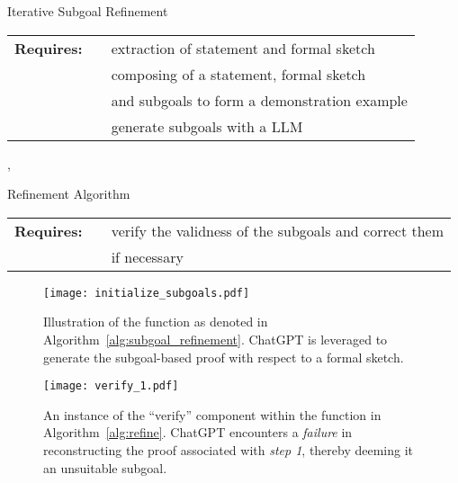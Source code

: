 \documentclass{article}
\begin{document}
\begin{algorithm}[]
\caption{Iterative Subgoal Refinement}
    \label{alg:subgoal_refinement}
\begin{tabular}{ l c l }
    \textbf{Requires: }
    &  & extraction of statement and formal sketch  \\
    &  & composing of a statement, formal sketch \\ 
    & & and subgoals to form a demonstration example \\
    &  & generate subgoals with a LLM \\ 
\end{tabular}
\begin{algorithmic}
                \State , 
                \State 
                \State 
                \State 
            \EndFor
        \EndFor
        \State \Return 
    \EndFunction
\end{algorithmic}
\end{algorithm}

\begin{algorithm}[]
\caption{Refinement Algorithm}
    \label{alg:refine}
\begin{tabular}{ l c l }
    \textbf{Requires: }
    &  & verify the validness of the subgoals and correct them \\
    & & if necessary \\
\end{tabular}
\begin{algorithmic}
            \Return 
        \EndIf
        \State 
        \State 
        \State \Return 
    \EndFunction
\end{algorithmic}
\end{algorithm}

\clearpage
\begin{figure*}
    \centering
    \texttt{[image: initialize\_subgoals.pdf]}
    \caption{Illustration of the  function as denoted in Algorithm~\ref{alg:subgoal_refinement}. ChatGPT is leveraged to generate the subgoal-based proof with respect to a formal sketch.}
    \label{fig:initialize_subgoals}
\end{figure*}

\begin{figure*}
    \centering
    \texttt{[image: verify\_1.pdf]}
    \caption{An instance of the ``verify'' component within the  function in Algorithm~\ref{alg:refine}. ChatGPT encounters a \emph{failure} in reconstructing the proof associated with \emph{step 1}, thereby deeming it an unsuitable subgoal.}
    \label{fig:verify_1}
\end{figure*}
\end{document}
